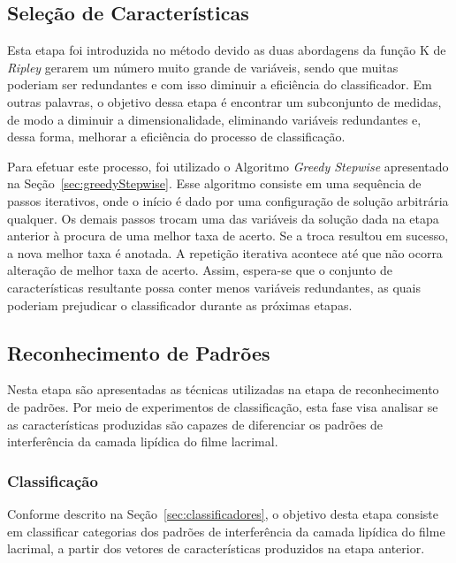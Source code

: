 \subsection{Seleção de Características}
\label{sec:metodoSelecaoC}

Esta etapa foi introduzida no método devido as duas abordagens da função K de \textit{Ripley} gerarem um número muito grande de variáveis, sendo que muitas poderiam ser redundantes e com isso diminuir a eficiência do classificador. Em outras palavras, o objetivo dessa etapa é encontrar um subconjunto de medidas, de modo a diminuir a dimensionalidade, eliminando variáveis redundantes e, dessa forma, melhorar a eficiência do processo de classificação.

Para efetuar este processo, foi utilizado o Algoritmo \textit{Greedy Stepwise} apresentado na Seção~\ref{sec:greedyStepwise}. Esse algoritmo consiste em uma sequência de passos iterativos, onde o início é dado por uma configuração de solução arbitrária qualquer. Os demais passos trocam uma das variáveis da solução dada na etapa anterior à procura de uma melhor taxa de acerto. Se a troca resultou em sucesso, a nova melhor taxa é anotada. A repetição iterativa acontece até que não ocorra alteração de melhor taxa de acerto. Assim, espera-se que o conjunto de características resultante possa conter menos variáveis redundantes, as quais poderiam prejudicar o classificador durante as próximas etapas.

\subsection{Reconhecimento de Padrões}
\label{sec:metodoReconhecimentoP}

Nesta etapa são apresentadas as técnicas utilizadas na etapa de reconhecimento de padrões. Por meio de experimentos de classificação, esta fase visa analisar se as características produzidas são capazes de diferenciar os padrões de interferência da camada lipídica do filme lacrimal.

\subsubsection{Classificação}
\label{sec:metodoClassificacao}

Conforme descrito na Seção~\ref{sec:classificadores}, o objetivo desta etapa consiste em classificar categorias dos padrões de interferência da camada lipídica do filme lacrimal, a partir dos vetores de características produzidos na etapa anterior.

